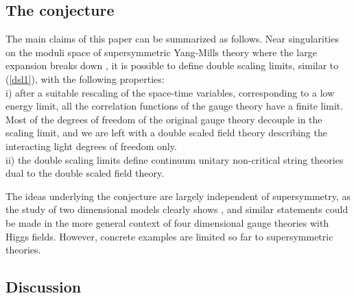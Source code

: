 \documentclass[a4paper,12pt]{article}
\begin{document}
%
\subsection{The conjecture}
%

The main claims of this paper can be summarized as follows.
Near singularities on the moduli space of \coordHE{} supersymmetric Yang-Mills theory where the large \coordHE{} expansion
breaks down \cite{fer}, it is possible to define double scaling limits,
similar to (\ref{dsl1}), with the following properties:\\
\noindent i) after a suitable rescaling of the space-time variables,
corresponding to a low energy limit, all the
correlation functions of the gauge theory have a finite limit.  
Most of the degrees of freedom of the original gauge 
theory decouple in the
scaling limit, and we are left with a double scaled field theory
describing the interacting light degrees of freedom only.\\
\noindent ii) the double scaling limits define \coordHE{} continuum unitary
non-critical string theories dual to the double scaled field theory.

The ideas underlying
the conjecture are largely independent of supersymmetry, as the study of
two dimensional models clearly shows \cite{fer2}, and
similar statements could be made in the more general
context of four dimensional gauge theories with Higgs fields.
However, concrete examples are limited so far to \coordHE{} 
supersymmetric theories.


%
\subsection{Discussion}
%
\end{document}

